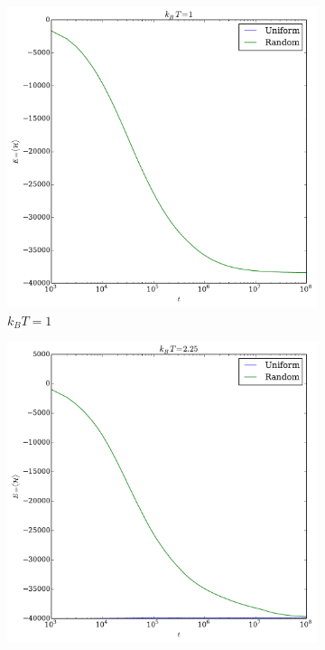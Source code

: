 \documentclass{scrartcl}
\begin{document}
\begin{figure}[H]
    \centering
    \begin{subfigure}{.32\textwidth}
        \includegraphics[width=\textwidth]{plots/1.pdf}
        \caption{$k_BT = 1$}
    \end{subfigure}%
    \begin{subfigure}{.32\textwidth}
        \includegraphics[width=\textwidth]{plots/2_25.pdf}

\end{subfigure}
\end{figure}
\end{document}
